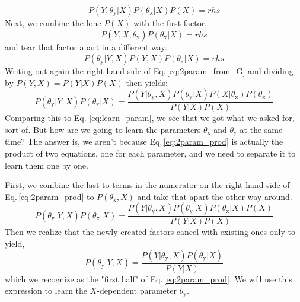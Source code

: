\documentclass[]{report}
\begin{document}
\begin{equation}
P( Y, \theta_\mathrm{y} | X )
P( \theta_\mathrm{x} | X )
P( X ) 
= 
rhs
\end{equation}
Next, we combine the lone $P(X)$ with the first factor,
\begin{equation}
P( Y, X, \theta_\mathrm{y} )
P( \theta_\mathrm{x} | X ) 
= 
rhs
\end{equation}
and tear that factor apart in a different way.
\begin{equation} \label{eq:2param_lhs}
P( \theta_\mathrm{y} | Y, X )
P( Y, X )
P( \theta_\mathrm{x} | X ) 
= 
rhs
\end{equation}
Writing out again the right-hand side of Eq.\,\ref{eq:2param_from_G} and dividing by $P(Y, X) = P(Y|X) P(X)$ then yields:
\begin{equation} \label{eq:2param_prod}
P( \theta_\mathrm{y} | Y, X )
P( \theta_\mathrm{x} | X ) 
= 
\frac
	{
		P( Y | \theta_\mathrm{y}, X )
		P( \theta_\mathrm{y} | X )
		P( X | \theta_\mathrm{x} )
		P( \theta_\mathrm{x} )
	}
	{
		P( Y | X )
		P( X )
	}
\end{equation}
Comparing this to Eq. \ref{eq:learn_param}, we see that we got what we asked for, sort of. But how are we going to learn the parameters $\theta_\mathrm{x}$ and $\theta_\mathrm{y}$ at the same time? The answer is, we aren't because Eq.\,\ref{eq:2param_prod} is actually the product of two equations, one for each parameter, and we need to separate it to learn them one by one.

First, we combine the last to terms in the numerator on the right-hand side of Eq.\,\ref{eq:2param_prod} to $P(\theta_\mathrm{x}, X)$ and take that apart the other way around.
\begin{equation}
P( \theta_\mathrm{y} | Y, X )
P( \theta_\mathrm{x} | X ) 
= 
\frac
	{
		P( Y | \theta_\mathrm{y}, X )
		P( \theta_\mathrm{y} | X )
		P( \theta_\mathrm{x} | X )
		P( X )
	}
	{
		P( Y | X )
		P( X )
	}
\end{equation}
Then we realize that the newly created factors cancel with existing ones only to yield,
\begin{equation} \label{eq:2param_Y}
P( \theta_\mathrm{y} | Y, X ) 
= 
\frac
	{
		P( Y | \theta_\mathrm{y}, X )
		P( \theta_\mathrm{y} | X )
	}
	{
		P( Y | X )
	}
\end{equation}
which we recognize as the "first half" of Eq.\,\ref{eq:2param_prod}. We will use this expression to learn the $X$-dependent parameter $\theta_\mathrm{y}$.
\end{document}
